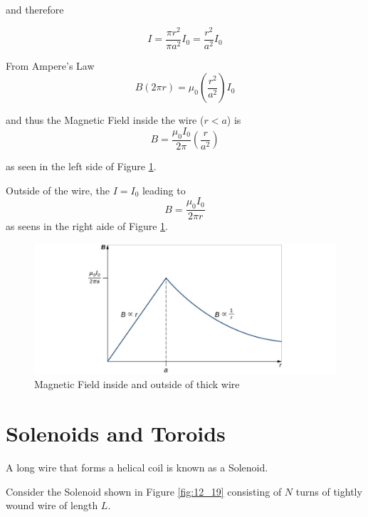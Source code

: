 \documentclass[14pt]{memoir}
\begin{document}
and therefore

\begin{equation}
I = \frac{\pi r^2}{\pi a^2} I_0 = \frac{r^2}{a^2} I_0
\end{equation}

From Ampere's Law
\begin{equation}
B(2 \pi r) = \mu_0 (\frac{r^2}{a^2}) I_0
\end{equation}

and thus the Magnetic Field inside the wire ($r<a$) is
\begin{equation}
B = \frac{\mu_0 I_0}{2 \pi} (\frac{r}{a^2})
\end{equation}

as seen in the left side of Figure \ref{fig:12_17}.

Outside of the wire, the $I = I_0$ leading to
\begin{equation}
B = \frac{\mu_0 I_0}{2 \pi r}
\end{equation}
as seens in the right aide of Figure \ref{fig:12_17}.


\begin{figure}[H]
\begin{center}
\includegraphics[scale=0.5]{fig/fig_12_17.jpg}
\caption{Magnetic Field inside and outside of thick wire}
\label{fig:12_17}
\end{center}
\end{figure}


\section{Solenoids and Toroids}

A long wire that forms a helical coil is known as a Solenoid. 

Consider the Solenoid shown in Figure \ref{fig:12_19} consisting of $N$ turns of tightly wound wire of length $L$. 
\end{document}
